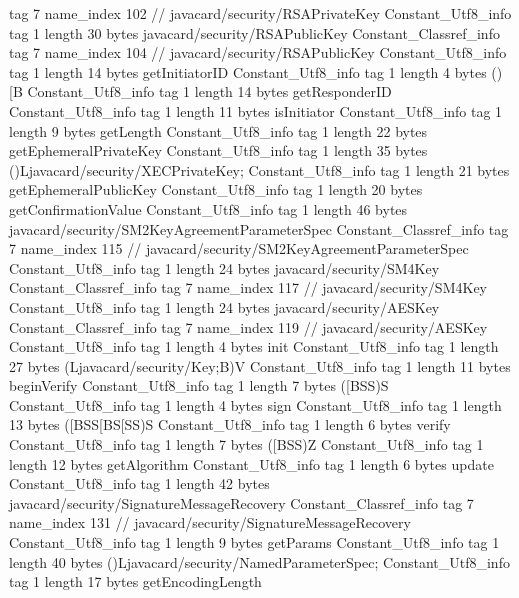 {{{			tag	7
			name_index	102		// javacard/security/RSAPrivateKey
		}
		Constant_Utf8_info {
			tag	1
			length	30
			bytes	javacard/security/RSAPublicKey
		}
		Constant_Classref_info {
			tag	7
			name_index	104		// javacard/security/RSAPublicKey
		}
		Constant_Utf8_info {
			tag	1
			length	14
			bytes	getInitiatorID
		}
		Constant_Utf8_info {
			tag	1
			length	4
			bytes	()[B
		}
		Constant_Utf8_info {
			tag	1
			length	14
			bytes	getResponderID
		}
		Constant_Utf8_info {
			tag	1
			length	11
			bytes	isInitiator
		}
		Constant_Utf8_info {
			tag	1
			length	9
			bytes	getLength
		}
		Constant_Utf8_info {
			tag	1
			length	22
			bytes	getEphemeralPrivateKey
		}
		Constant_Utf8_info {
			tag	1
			length	35
			bytes	()Ljavacard/security/XECPrivateKey;
		}
		Constant_Utf8_info {
			tag	1
			length	21
			bytes	getEphemeralPublicKey
		}
		Constant_Utf8_info {
			tag	1
			length	20
			bytes	getConfirmationValue
		}
		Constant_Utf8_info {
			tag	1
			length	46
			bytes	javacard/security/SM2KeyAgreementParameterSpec
		}
		Constant_Classref_info {
			tag	7
			name_index	115		// javacard/security/SM2KeyAgreementParameterSpec
		}
		Constant_Utf8_info {
			tag	1
			length	24
			bytes	javacard/security/SM4Key
		}
		Constant_Classref_info {
			tag	7
			name_index	117		// javacard/security/SM4Key
		}
		Constant_Utf8_info {
			tag	1
			length	24
			bytes	javacard/security/AESKey
		}
		Constant_Classref_info {
			tag	7
			name_index	119		// javacard/security/AESKey
		}
		Constant_Utf8_info {
			tag	1
			length	4
			bytes	init
		}
		Constant_Utf8_info {
			tag	1
			length	27
			bytes	(Ljavacard/security/Key;B)V
		}
		Constant_Utf8_info {
			tag	1
			length	11
			bytes	beginVerify
		}
		Constant_Utf8_info {
			tag	1
			length	7
			bytes	([BSS)S
		}
		Constant_Utf8_info {
			tag	1
			length	4
			bytes	sign
		}
		Constant_Utf8_info {
			tag	1
			length	13
			bytes	([BSS[BS[SS)S
		}
		Constant_Utf8_info {
			tag	1
			length	6
			bytes	verify
		}
		Constant_Utf8_info {
			tag	1
			length	7
			bytes	([BSS)Z
		}
		Constant_Utf8_info {
			tag	1
			length	12
			bytes	getAlgorithm
		}
		Constant_Utf8_info {
			tag	1
			length	6
			bytes	update
		}
		Constant_Utf8_info {
			tag	1
			length	42
			bytes	javacard/security/SignatureMessageRecovery
		}
		Constant_Classref_info {
			tag	7
			name_index	131		// javacard/security/SignatureMessageRecovery
		}
		Constant_Utf8_info {
			tag	1
			length	9
			bytes	getParams
		}
		Constant_Utf8_info {
			tag	1
			length	40
			bytes	()Ljavacard/security/NamedParameterSpec;
		}
		Constant_Utf8_info {
			tag	1
			length	17
			bytes	getEncodingLength
}}}
